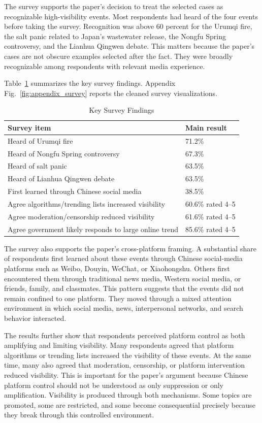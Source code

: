 \documentclass[conference]{IEEEtran}
\begin{document}
The survey supports the paper's decision to treat the selected cases as recognizable high-visibility events. Most respondents had heard of the four events before taking the survey. Recognition was above 60 percent for the Urumqi fire, the salt panic related to Japan's wastewater release, the Nongfu Spring controversy, and the Lianhua Qingwen debate. This matters because the paper's cases are not obscure examples selected after the fact. They were broadly recognizable among respondents with relevant media experience.

Table~\ref{tab:survey_summary} summarizes the key survey findings. Appendix Fig.~\ref{fig:appendix_survey} reports the cleaned survey visualizations.

\begin{table}[H]
\centering
\caption{Key Survey Findings}
\label{tab:survey_summary}
\footnotesize
\begin{tabular}{p{}p{}}
\toprule
Survey item & Main result \\
\midrule
Heard of Urumqi fire & 71.2\% \\
Heard of Nongfu Spring controversy & 67.3\% \\
Heard of salt panic & 63.5\% \\
Heard of Lianhua Qingwen debate & 63.5\% \\
First learned through Chinese social media & 38.5\% \\
Agree algorithms/trending lists increased visibility & 60.6\% rated 4--5 \\
Agree moderation/censorship reduced visibility & 61.6\% rated 4--5 \\
Agree government likely responds to large online trend & 85.6\% rated 4--5 \\
\bottomrule
\end{tabular}
\end{table}

The survey also supports the paper's cross-platform framing. A substantial share of respondents first learned about these events through Chinese social-media platforms such as Weibo, Douyin, WeChat, or Xiaohongshu. Others first encountered them through traditional news media, Western social media, or friends, family, and classmates. This pattern suggests that the events did not remain confined to one platform. They moved through a mixed attention environment in which social media, news, interpersonal networks, and search behavior interacted.

The results further show that respondents perceived platform control as both amplifying and limiting visibility. Many respondents agreed that platform algorithms or trending lists increased the visibility of these events. At the same time, many also agreed that moderation, censorship, or platform intervention reduced visibility. This is important for the paper's argument because Chinese platform control should not be understood as only suppression or only amplification. Visibility is produced through both mechanisms. Some topics are promoted, some are restricted, and some become consequential precisely because they break through this controlled environment.
\end{document}
